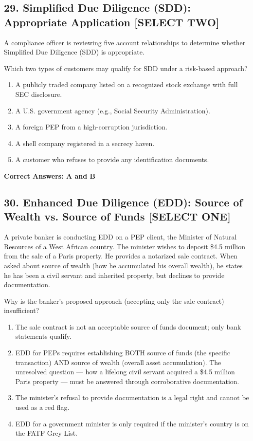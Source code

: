 \documentclass[11pt,a4paper]{article}
\begin{document}
	\subsection{29. Simplified Due Diligence (SDD): Appropriate Application \textnormal{[SELECT TWO]}}
	
	A compliance officer is reviewing five account relationships to determine whether Simplified Due Diligence (SDD) is appropriate.
	
	Which two types of customers may qualify for SDD under a risk-based approach?
	
	\begin{enumerate}[label=\Alph*.]
		\item A publicly traded company listed on a recognized stock exchange with full SEC disclosure.
		\item A U.S. government agency (e.g., Social Security Administration).
		\item A foreign PEP from a high-corruption jurisdiction.
		\item A shell company registered in a secrecy haven.
		\item A customer who refuses to provide any identification documents.
	\end{enumerate}
	
	\textbf{Correct Answers: A and B}
	
	\subsection{30. Enhanced Due Diligence (EDD): Source of Wealth vs. Source of Funds \textnormal{[SELECT ONE]}}
	
	A private banker is conducting EDD on a PEP client, the Minister of Natural Resources of a West African country. The minister wishes to deposit \$4.5 million from the sale of a Paris property. He provides a notarized sale contract. When asked about source of wealth (how he accumulated his overall wealth), he states he has been a civil servant and inherited property, but declines to provide documentation.
	
	Why is the banker's proposed approach (accepting only the sale contract) insufficient?
	
	\begin{enumerate}[label=\Alph*.]
		\item The sale contract is not an acceptable source of funds document; only bank statements qualify.
		\item EDD for PEPs requires establishing BOTH source of funds (the specific transaction) AND source of wealth (overall asset accumulation). The unresolved question — how a lifelong civil servant acquired a \$4.5 million Paris property — must be answered through corroborative documentation.
		\item The minister's refusal to provide documentation is a legal right and cannot be used as a red flag.
		\item EDD for a government minister is only required if the minister's country is on the FATF Grey List.
	\end{enumerate}
	
\end{document}
